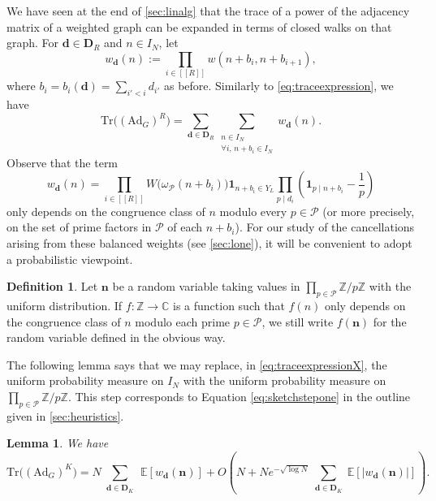\documentclass[11pt]{amsart}
\newtheorem{lemma}[theorem]{Lemma}
\theoremstyle{definition}
\newtheorem{definition}[theorem]{Definition}
\newcommand{\sinterval}[1]{[\![#1]\!] }
\newcommand{\abs}[1]{\left|#1\right|}
\newcommand{\ind}[1]{\mathbf{1}_{#1}}
\newcommand{\Z}{\mathbb{Z}}
\newcommand{\C}{\mathbb{C}}
\newcommand{\E}{\mathbb{E}}
\newcommand{\Ad}{\mathrm{Ad}}
\newcommand{\Tr}{\mathrm{Tr}}
\newcommand{\N}{I_N}
\newcommand{\primes}{\mathcal{P}}
\renewcommand{\d}{\boldsymbol{d}}
\newcommand{\n}{\mathbf{n}}
\newcommand{\graph}{G}
\newcommand{\sommespart}{b}
\newcommand{\fancyD}{\mathbf{D}}
\newcommand{\Dsf}{\fancyD_{\!\repK}}
\newcommand{\DsfR}{\fancyD_{\!\tupsize}}
\newcommand{\elln}{L}
\newcommand{\Y}{Y_{\!\elln}}
\newcommand{\repK}{K}
\newcommand{\tupsize}{R}
\begin{document}
We have seen at the end of \cref{sec:linalg} that the trace of a power of the adjacency matrix of a weighted graph can be expanded in terms of closed walks on that graph. For $\d\in \DsfR$ and $n\in \N$, let 
\begin{equation}
\label{eq:weightwalk}
w_{\d}(n) := \prod_{i\in \sinterval{\tupsize}} w(n+\sommespart_i, n+\sommespart_{i+1}),
\end{equation}
where $\sommespart_i = \sommespart_i(\d) = \sum_{i'<i} d_{i'}$ as before. Similarly to \cref{eq:traceexpression}, we have
\begin{equation}
\label{eq:traceexpressionX}
\Tr \big((\Ad_{\graph})^{\tupsize}\big) = \sum_{\d\in \DsfR}   \sum_{\substack{n\in \N\\ \forall i,\, n+\sommespart_i\in \N}} w_{\d}(n).
\end{equation}
Observe that the term
\begin{equation*}
w_{\d}(n) = \prod_{i\in \sinterval{\tupsize}} W\big(\omega_{\primes}(n+\sommespart_i)\big) \ind{n+\sommespart_i\in \Y} \prod_{p\mid d_i} \left(\ind{p\mid n + \sommespart_i} - \frac{1}{p}\right)
\end{equation*}
only depends on the congruence class of $n$ modulo every $p\in \primes$ (or more precisely, on the set of prime factors in $\primes$ of each $n+\sommespart_i$). For our study of the cancellations arising from these balanced weights (see \cref{sec:lone}), it will be convenient to adopt a probabilistic viewpoint.

\begin{definition}
\label{def:randvar}
Let $\n$ be a random variable taking values in $\prod_{p\in \primes} \Z/p\Z$ with the uniform distribution. If $f:\Z\to \C$ is a function such that $f(n)$ only depends on the congruence class of $n$ modulo each prime $p\in \primes$, we still write $f(\n)$ for the random variable defined in the obvious way. 
\end{definition}

The following lemma says that we may replace, in \cref{eq:traceexpressionX}, the uniform probability measure on $\N$ with the uniform probability measure on $\prod_{p\in \primes} \Z/p\Z$. This step corresponds to Equation \cref{eq:sketchstepone} in the outline given in \cref{sec:heuristics}.

\begin{lemma}
\label{lem:useflst}
We have
\begin{equation}
\label{eq:fromsumtoexp}
\Tr \big((\Ad_{\graph})^{\repK}\big) = N \sum_{\substack{\d\in \Dsf}}\,   \E \left[w_{\d}(\n)
 \right] + O\!\left(N+Ne^{-\sqrt{\log N}} \sum_{\substack{\d\in \Dsf}} \mathbb{E}\left[ \abs{ w_{\d}(\n)   }\right]\right).
\end{equation}
\end{lemma}
\end{document}
